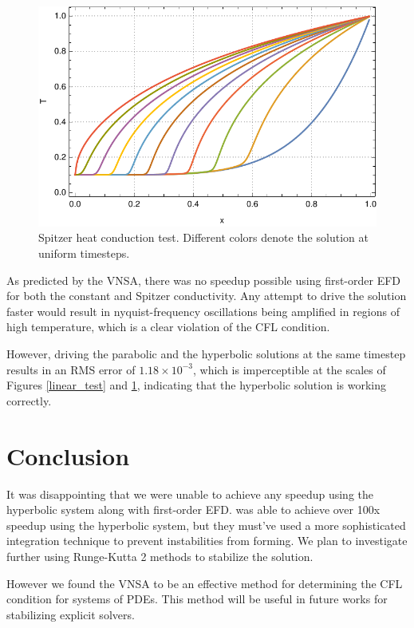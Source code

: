 \documentclass[iop]{emulateapj}
\begin{document}
		\begin{figure}[h!]
			\centering
			\includegraphics[width=\columnwidth]{figures/T_spitzer}
			\caption{Spitzer heat conduction test. Different colors denote the solution at uniform timesteps.}
			\label{spitzer_test}
		\end{figure}
		
		As predicted by the VNSA, there was no speedup possible using first-order EFD for both the constant and Spitzer conductivity.
		Any attempt to drive the solution faster would result in nyquist-frequency oscillations being amplified in regions of high temperature, which is a clear violation of the CFL condition.
	
		However, driving the parabolic and the hyperbolic solutions at the same timestep results in an RMS error of $1.18 \times 10^{-3}$, which is imperceptible at the scales of Figures \ref{linear_test} and \ref{spitzer_test}, indicating that the hyperbolic solution is working correctly.
	
	\section{Conclusion}
	
		It was disappointing that we were unable to achieve any speedup using the hyperbolic system along with first-order EFD. 
		\cite{A} was able to achieve over 100x speedup using the hyperbolic system, but they must've used a more sophisticated integration technique to prevent instabilities from forming. 
		We plan to investigate further using Runge-Kutta 2 methods to stabilize the solution.
		
		However we found the VNSA to be an effective method for determining the CFL condition for systems of PDEs.
		This method will be useful in future works for stabilizing explicit solvers.
			
\end{document}

